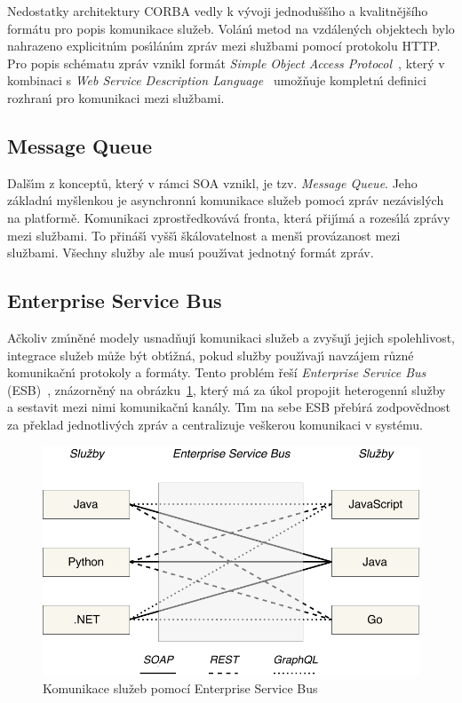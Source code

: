 Nedostatky architektury \gls{CORBA} vedly k vývoji jednodušš\'{\i}ho
a kvalitnějšího formátu pro popis komunikace služeb. Volán\'{\i} metod na vzdálen\'ych objektech
bylo nahrazeno explicitn\'{\i}m pos\'{\i}lán\'{\i}m zpráv mezi službami pomocí protokolu \gls{HTTP}.
Pro popis schématu zpráv vznikl formát \textit{Simple Object Access
Protocol}~\cite{box2000simple}, kter\'y v kombinaci s
\textit{Web Service Description Language}~\cite{christensen2001web}
umožňuje kompletn\'{\i} definici rozhran\'{\i} pro komunikaci mezi službami.

\subsection{Message Queue}

Dalš\'{\i}m z konceptů, kter\'y v rámci \gls{SOA} vznikl, je tzv. \textit{Message Queue}.
Jeho základn\'{\i} myšlenkou je asynchronn\'{\i} komunikace služeb pomoc\'{\i} zpráv nezávisl\'ych
na platformě. Komunikaci zprostředkovává fronta, která přij\'{\i}má a rozes\'{\i}lá
zprávy mezi službami. To přináš\'{\i} vyšš\'{\i} škálovatelnost a menš\'{\i} provázanost
mezi službami. Všechny služby ale mus\'{\i} použ\'{\i}vat jednotn\'y formát zpráv.

\subsection{Enterprise Service Bus}

Ačkoliv zm\'{\i}něné modely usnadňuj\'{\i} komunikaci služeb a zvyšuj\'{\i} jejich
spolehlivost, integrace služeb může b\'yt obt\'{\i}žná, pokud služby použ\'{\i}vaj\'{\i}
navzájem různé komunikačn\'{\i} protokoly a formáty. Tento problém řeší \textit{Enterprise Service
Bus} (\gls{ESB})~\cite{chappell2004enterprise}, znázorněn\'y na obrázku~\ref{fig:enterprise-service-bus},
kter\'y má za úkol propojit heterogenn\'{\i} služby a sestavit mezi nimi komunikačn\'{\i} kanály.
T\'{\i}m na sebe \gls{ESB} přeb\'{\i}rá zodpovědnost za překlad jednotliv\'ych zpráv a centralizuje
veškerou komunikaci v systému.

\begin{figure}
    \centering
    \includegraphics[keepaspectratio=true, width=0.6\linewidth]{figures/enterprise-service-bus.pdf}
    \caption{Komunikace služeb pomocí Enterprise Service Bus}
    \label{fig:enterprise-service-bus}
\end{figure}

